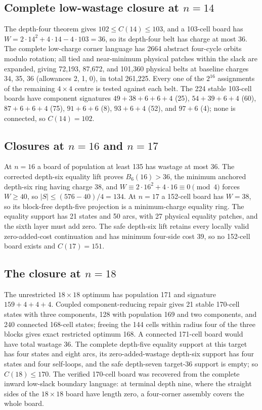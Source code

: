 \documentclass[10pt]{article}
\theoremstyle{remark}
\begin{document}
\subsection[Complete low-wastage closure at n=14]{Complete low-wastage closure at $n=14$}\label{app:n14}

The depth-four theorem gives $102\le C(14)\le103$, and a 103-cell board has
$W=2\cdot14^2+4\cdot14-4\cdot103=36$, so its depth-four belt has charge at most
36.  The complete low-charge corner language has 2664 abstract four-cycle orbits
modulo rotation; all tied and near-minimum physical patches within the slack are
expanded, giving 72,193, 87,672, and 101,360 physical belts at baseline charges
34, 35, 36 (allowances 2, 1, 0), in total 261,225.  Every one of the $2^{16}$
assignments of the remaining $4\times4$ centre is tested against each belt.  The
224 stable 103-cell boards have component signatures
$49+38+6+6+4$ (25), $54+39+6+4$ (60), $87+6+6+4$ (75), $91+6+6$ (8),
$93+6+4$ (52), and $97+6$ (4); none is connected, so $C(14)=102$.

\subsection[Closures at n=16 and n=17]{Closures at $n=16$ and $n=17$}\label{app:n17}

At $n=16$ a board of population at least 135 has wastage at most 36.  The
corrected depth-six equality lift proves $B_6(16)>36$, the minimum anchored
depth-six ring having charge 38, and $W\equiv2\cdot16^2+4\cdot16\equiv0\pmod4$
forces $W\ge40$, so $|S|\le(576-40)/4=134$.  At $n=17$ a 152-cell board has
$W=38$, so its block-free depth-five projection is a minimum-charge equality ring.
The equality support has 21 states and 50 arcs, with 27 physical equality
patches, and the sixth layer must add zero.  The safe depth-six lift retains every
locally valid zero-added-cost continuation and has minimum four-side cost 39, so
no 152-cell board exists and $C(17)=151$.

\subsection[The closure at n=18]{The closure at $n=18$}\label{app:n18}

The unrestricted $18\times18$ optimum has population 171 and signature
$159+4+4+4$.  Coupled component-reducing repair gives 21 stable 170-cell states
with three components, 128 with population 169 and two components, and 240
connected 168-cell states; freeing the 144 cells within radius four of the three
blocks gives exact restricted optimum 168.  A connected 171-cell board would have
total wastage 36.  The complete depth-five equality support at this target has
four states and eight arcs, its zero-added-wastage depth-six support has four
states and four self-loops, and the safe depth-seven target-36 support is empty;
so $C(18)\le170$.  The verified 170-cell board was recovered from the complete
inward low-slack boundary language: at terminal depth nine, where the straight
sides of the $18\times18$ board have length zero, a four-corner assembly covers
the whole board.
\end{document}
